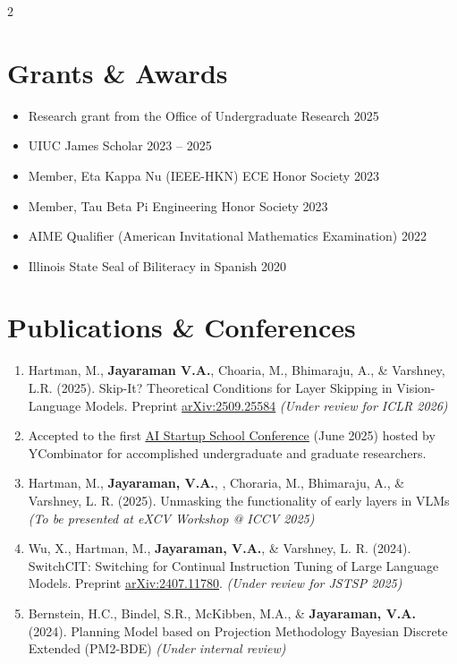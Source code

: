 \documentclass[letterpaper,10pt]{article}
\begin{document}
\begin{paracol}{2}
    
    \section{Grants \& Awards}
    \begin{itemize}[itemsep=-3pt, parsep=5pt, leftmargin=0.25in]
        \item Research grant from the Office of Undergraduate Research \hfill 2025
        \item UIUC James Scholar \hfill 2023 -- 2025
        \item Member, Eta Kappa Nu (IEEE-HKN) ECE Honor Society \hfill 2023
        \item Member, Tau Beta Pi Engineering Honor Society \hfill 2023
        \item AIME Qualifier (American Invitational Mathematics Examination) \hfill 2022
        \item Illinois State Seal of Biliteracy in Spanish \hfill 2020
    \end{itemize}
    
    
    \switchcolumn
    
    
    \section{Publications \& Conferences}
    \begin{enumerate}[leftmargin=0.25in, itemsep=-2pt]
        \item Hartman, M., \textbf{Jayaraman V.A.}, Choaria, M., Bhimaraju, A., \& Varshney, L.R. (2025). Skip-It? Theoretical Conditions for Layer Skipping in Vision-Language Models. Preprint \href{https://www.arxiv.org/abs/2509.25584}{\underline{arXiv:2509.25584}} \textit{(Under review for ICLR 2026)}
        \item Accepted to the first \href{https://events.ycombinator.com/ai-sus}{\underline{AI Startup School Conference}} (June 2025) hosted by YCombinator for accomplished undergraduate and graduate researchers.
        \item Hartman, M., \textbf{Jayaraman, V.A.}, , Choraria, M., Bhimaraju, A., \& Varshney, L. R. (2025). Unmasking the functionality of early layers in VLMs \textit{(To be presented at eXCV Workshop @ ICCV 2025)}
        \item Wu, X., Hartman, M., \textbf{Jayaraman, V.A.}, \& Varshney, L. R. (2024). SwitchCIT: Switching for Continual Instruction Tuning of Large Language Models. Preprint \href{https://arxiv.org/abs/2407.11780}{\underline{arXiv:2407.11780}}. \textit{(Under review for JSTSP 2025)}
        \item Bernstein, H.C., Bindel, S.R., McKibben, M.A., \& \textbf{Jayaraman, V.A.} (2024). Planning Model based on Projection Methodology Bayesian Discrete Extended (PM2-BDE) \textit{(Under internal review)}
    \end{enumerate}
    

\end{paracol}
\end{document}
